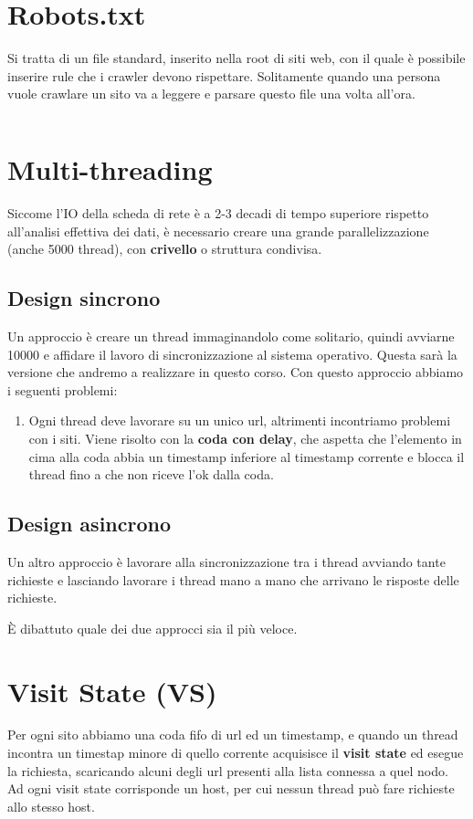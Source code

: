 \documentclass[\main/main.tex]{subfiles}
\begin{document}
\section{Robots.txt}
Si tratta di un file standard, inserito nella root di siti web, con il quale è possibile inserire rule che i crawler devono rispettare. Solitamente quando una persona vuole crawlare un sito va a leggere e parsare questo file una volta all'ora.

\inputminted{ApacheConf}{\main/chapters/robots.txt}

\section{Multi-threading}
Siccome l'IO della scheda di rete è a 2-3 decadi di tempo superiore rispetto all'analisi effettiva dei dati, è necessario creare una grande parallelizzazione (anche 5000 thread), con \textbf{crivello} o struttura condivisa.

\subsection{Design sincrono}
Un approccio è creare un thread immaginandolo come solitario, quindi avviarne 10000 e affidare il lavoro di sincronizzazione al sistema operativo.
Questa sarà la versione che andremo a realizzare in questo corso.
Con questo approccio abbiamo i seguenti problemi:

\begin{enumerate}
\item Ogni thread deve lavorare su un unico url, altrimenti incontriamo problemi con i siti. Viene risolto con la \textbf{coda con delay}, che aspetta che l'elemento in cima alla coda abbia un timestamp inferiore al timestamp corrente e blocca il thread fino a che non riceve l'ok dalla coda.
\end{enumerate}

\subsection{Design asincrono}
Un altro approccio è lavorare alla sincronizzazione tra i thread avviando tante richieste e lasciando lavorare i thread mano a mano che arrivano le risposte delle richieste.

È dibattuto quale dei due approcci sia il più veloce.

\section{Visit State (VS)}
Per ogni sito abbiamo una coda fifo di url ed un timestamp, e quando un thread incontra un timestap minore di quello corrente acquisisce il \textbf{visit state} ed esegue la richiesta, scaricando alcuni degli url presenti alla lista connessa a quel nodo. Ad ogni visit state corrisponde un host, per cui nessun thread può fare richieste allo stesso host.
\end{document}

